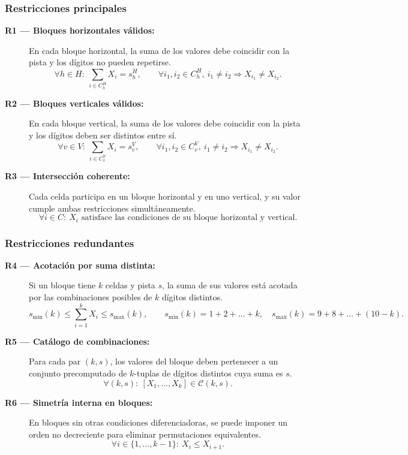 \subsubsection*{Restricciones principales}
\begin{description}
  \item[\textbf{R1 — Bloques horizontales válidos:}] En cada bloque horizontal, la suma de los valores debe coincidir con la pista y los dígitos no pueden repetirse.  
  \[
  \forall h \in H:\ \sum_{i \in C^H_h} X_i = s^H_h,
  \qquad
  \forall i_1,i_2 \in C^H_h,\ i_1 \neq i_2 \Rightarrow X_{i_1} \neq X_{i_2}.
  \]

  \item[\textbf{R2 — Bloques verticales válidos:}] En cada bloque vertical, la suma de los valores debe coincidir con la pista y los dígitos deben ser distintos entre sí.  
  \[
  \forall v \in V:\ \sum_{i \in C^V_v} X_i = s^V_v,
  \qquad
  \forall i_1,i_2 \in C^V_v,\ i_1 \neq i_2 \Rightarrow X_{i_1} \neq X_{i_2}.
  \]

  \item[\textbf{R3 — Intersección coherente:}] Cada celda participa en un bloque horizontal y en uno vertical, y su valor cumple ambas restricciones simultáneamente.  
  \[
  \forall i \in C:\ X_i \text{ satisface las condiciones de su bloque horizontal y vertical.}
  \]
\end{description}

\subsubsection*{Restricciones redundantes}
\begin{description}
  \item[\textbf{R4 — Acotación por suma distinta:}] Si un bloque tiene \(k\) celdas y pista \(s\), la suma de sus valores está acotada por las combinaciones posibles de \(k\) dígitos distintos.  
  \[
  s_{\min}(k) \le \sum_{i=1}^{k} X_i \le s_{\max}(k),
  \qquad
  s_{\min}(k) = 1 + 2 + \dots + k,\quad
  s_{\max}(k) = 9 + 8 + \dots + (10 - k).
  \]

  \item[\textbf{R5 — Catálogo de combinaciones:}] Para cada par \((k,s)\), los valores del bloque deben pertenecer a un conjunto precomputado de \(k\)-tuplas de dígitos distintos cuya suma es \(s\).  
  \[
  \forall (k,s):\ [X_1,\dots,X_k] \in \mathcal{C}(k,s).
  \]

  \item[\textbf{R6 — Simetría interna en bloques:}] En bloques sin otras condiciones diferenciadoras, se puede imponer un orden no decreciente para eliminar permutaciones equivalentes.  
  \[
  \forall i \in \{1,\dots,k-1\}:\ X_i \le X_{i+1}.
  \]
\end{description}

